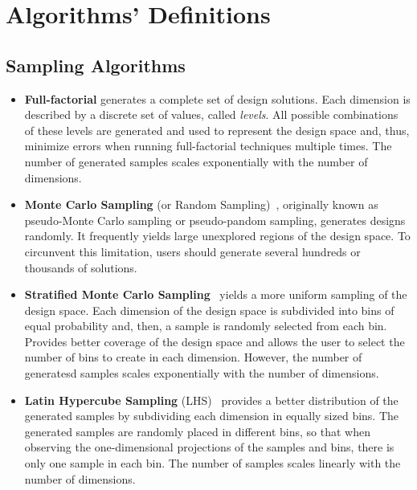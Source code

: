 \chapter{Algorithms' Definitions}
\label{appendix:AlgorithmsDefinitions}


\section{Sampling Algorithms} 
\begin{itemize}
	
\item \textbf{Full-factorial} generates a complete set of design solutions. Each dimension is described by a discrete set of values, called \textit{levels}. All possible combinations of these levels are generated and used to represent the design space and, thus, minimize errors when running full-factorial techniques multiple times. The number of generated samples scales exponentially with the number of dimensions. 
	
\item \textbf{Monte Carlo Sampling} (or Random Sampling)~\cite{Giunta2003DOE}, originally known as pseudo-Monte Carlo sampling or pseudo-pandom sampling, generates designs randomly. It frequently yields large unexplored regions of the design space. To circunvent this limitation, users should generate several hundreds or thousands of solutions.

\item \textbf{Stratified Monte Carlo Sampling}~\cite{Giunta2003DOE} yields a more uniform sampling of the design space. Each dimension of the design space is subdivided into bins of equal probability and, then, a sample is randomly selected from each bin. Provides better coverage of the design space and allows the user to select the number of bins to create in each dimension. However, the number of generatesd samples scales exponentially with the number of dimensions.

\item \textbf{Latin Hypercube Sampling} (LHS)~\cite{Giunta2003DOE} provides a better distribution of the generated samples by subdividing each dimension in equally sized bins. The generated samples are randomly placed in different bins, so that when observing the one-dimensional projections of the samples and bins, there is only one sample in each bin. The number of samples scales linearly with the number of dimensions.

\end{itemize}

